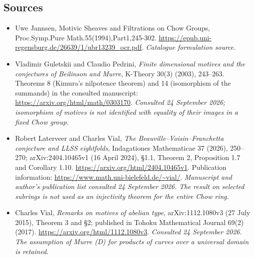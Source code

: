 \documentclass[11pt]{article}
\begin{document}
\subsection{Sources}
\begin{itemize}\raggedright
\item[\textnormal{[S1]}]\hypertarget{source:statement:1}{} Uwe Jannsen, Motivic Sheaves and Filtrations on Chow Groups, Proc.Symp.Pure Math.55(1994),Part1,245-302.
\url{https://epub.uni-regensburg.de/26639/1/ubr13239_ocr.pdf}.
{\small\textit{Catalogue formulation source.}}
\item[\textnormal{[E1]}]\hypertarget{extra:statement:1}{} Vladimir Guletskii and
Claudio Pedrini, \emph{Finite dimensional motives and the conjectures of
Beilinson and Murre}, K-Theory 30(3) (2003), 243--263.
Theorems 8 (Kimura's nilpotence theorem) and 14 (isomorphism of the summands)
in the consulted manuscript:
\url{https://arxiv.org/html/math/0303170}.
{\small\textit{Consulted 24 September 2026; isomorphism of motives is not
identified with equality of their images in a fixed Chow group.}}
\item[\textnormal{[E2]}]\hypertarget{extra:statement:2}{} Robert Laterveer and Charles
Vial, \emph{The Beauville--Voisin--Franchetta conjecture and LLSS eightfolds},
Indagationes Mathematicae 37 (2026), 250--270;
arXiv:2404.10465v1 (16 April 2024), \S1.1, Theorem 2, Proposition 1.7 and
Corollary 1.10.
\url{https://arxiv.org/html/2404.10465v1}.
Publication information:
\url{https://www.math.uni-bielefeld.de/~vial/}.
{\small\textit{Manuscript and author's publication list consulted
24 September 2026. The result on selected subrings is not used as an
injectivity theorem for the entire Chow ring.}}
\item[\textnormal{[E3]}]\hypertarget{extra:statement:3}{} Charles Vial,
\emph{Remarks on motives of abelian type}, arXiv:1112.1080v3
(27 July 2015), Theorem 3 and \S2; published in Tohoku Mathematical Journal
69(2) (2017).
\url{https://arxiv.org/html/1112.1080v3}.
{\small\textit{Consulted 24 September 2026. The assumption of Murre (D)
for products of curves over a universal domain is retained.}}
\end{itemize}
\end{document}
